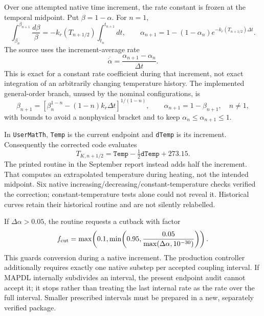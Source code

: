 \documentclass[oneside,openany]{amsdtx}
\begin{document}
Over one attempted native time increment, the rate constant is frozen at the temporal midpoint. Put $\beta=1-\alpha$. For $n=1$,
\begin{equation}
 \int_{\beta_n}^{\beta_{n+1}}\frac{d\beta}{\beta}
 =-k_r(T_{n+1/2})\int_{t_n}^{t_{n+1}}dt,
 \qquad
 \boxed{\alpha_{n+1}=1-(1-\alpha_n)e^{-k_r(T_{n+1/2})\Delta t}}.
\end{equation}
The source uses the increment-average rate
\begin{equation}
 \overline{\dot\alpha}=\frac{\alpha_{n+1}-\alpha_n}{\Delta t}.
\end{equation}
This is exact for a constant rate coefficient during that increment, not exact integration of an arbitrarily changing temperature history. The implemented general-order branch, unused by the nominal configurations, is
\begin{equation}
 \beta_{n+1}=\left[\beta_n^{1-n}-(1-n)k_r\Delta t\right]^{1/(1-n)},
 \qquad \alpha_{n+1}=1-\beta_{n+1},\quad n\ne1,
\end{equation}
with bounds to avoid a nonphysical bracket and to keep $\alpha_n\leq\alpha_{n+1}\leq1$.

In \texttt{UserMatTh}, \texttt{Temp} is the current endpoint and \texttt{dTemp} is its increment. Consequently the corrected code evaluates
\begin{equation}
 T_{K,n+1/2}=\texttt{Temp}-\tfrac12\texttt{dTemp}+273.15.
\end{equation}
The printed routine in the September report instead adds half the increment. That computes an extrapolated temperature during heating, not the intended midpoint. Six native increasing/decreasing/constant-temperature checks verified the correction; constant-temperature tests alone could not reveal it. Historical curves retain their historical routine and are not silently relabelled.

If $\Delta\alpha>0.05$, the routine requests a cutback with factor
\begin{equation}
 f_{\rm cut}=\max\!\left(0.1,\min\!\left(0.95,\frac{0.05}{\max(\Delta\alpha,10^{-30})}\right)\right).
\end{equation}
This guards conversion during a native increment. The production controller additionally requires exactly one native substep per accepted coupling interval. If MAPDL internally subdivides an interval, the present endpoint audit cannot accept it; it stops rather than treating the last internal rate as the rate over the full interval. Smaller prescribed intervals must be prepared in a new, separately verified package.
\end{document}
